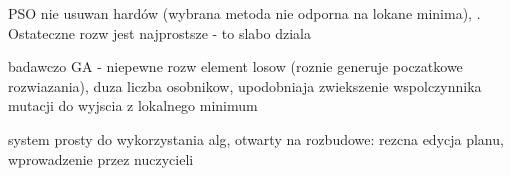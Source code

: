 \par PSO nie usuwan hardów (wybrana metoda nie odporna na lokane minima), . Ostateczne rozw jest najprostsze - to slabo dziala
\par badawczo 
GA - niepewne rozw element losow (roznie generuje poczatkowe rozwiazania), duza liczba osobnikow, upodobniaja zwiekszenie wspolczynnika mutacji do wyjscia z lokalnego minimum
\par system prosty do wykorzystania alg, otwarty na rozbudowe: rezcna edycja planu, wprowadzenie przez nuczycieli 






